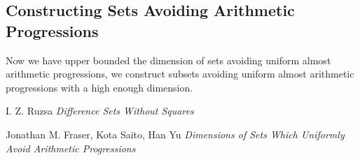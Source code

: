 \documentclass{article}
\theoremstyle{plain}
\theoremstyle{plain}
\begin{document}
\subsection{Constructing Sets Avoiding Arithmetic Progressions}

Now we have upper bounded the dimension of sets avoiding uniform almost arithmetic progressions, we construct subsets avoiding uniform almost arithmetic progressions with a high enough dimension.

\begin{thebibliography}{9}

I. Z. Ruzsa
\textit{Difference Sets Without Squares}

Jonathan M. Fraser, Kota Saito, Han Yu
\textit{Dimensions of Sets Which Uniformly Avoid Arithmetic Progressions}

\end{thebibliography}
\end{document}
